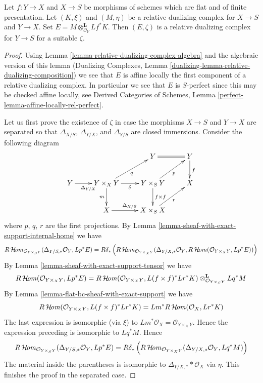 \begin{lemma}
\label{lemma-relative-dualizing-composition}
Let $f : Y \to X$ and $X \to S$ be morphisms of schemes
which are flat and of finite presentation.
Let $(K, \xi)$ and $(M, \eta)$
be a relative dualizing complex for $X \to S$ and $Y \to X$.
Set $E = M \otimes_{\mathcal{O}_Y}^\mathbf{L} Lf^*K$.
Then $(E, \zeta)$ is a relative dualizing complex for $Y \to S$ for
a suitable $\zeta$.
\end{lemma}

\begin{proof}
Using Lemma \ref{lemma-relative-dualizing-complex-algebra}
and the algebraic version of this lemma (Dualizing Complexes, Lemma
\ref{dualizing-lemma-relative-dualizing-composition})
we see that $E$
is affine locally the first component of a relative dualizing complex.
In particular we see that $E$
is $S$-perfect since this may be checked affine locally, see
Derived Categories of Schemes, Lemma
\ref{perfect-lemma-affine-locally-rel-perfect}.

\medskip\noindent
Let us first prove the existence of $\zeta$ in case the
morphisms $X \to S$ and $Y \to X$ are separated so that
$\Delta_{X/S}$, $\Delta_{Y/X}$, and $\Delta_{Y/S}$
are closed immersions. Consider the following diagram
$$
\xymatrix{
& & Y \ar@{=}[r] & Y \ar[d]^f \\
Y \ar[r]_{\Delta_{Y/X}} &
Y \times_X Y \ar[d]_m \ar[r]_\delta \ar[ru]_q &
Y \times_S Y \ar[d]^{f \times f} \ar[ru]_p & X\\
& X \ar[r]^{\Delta_{X/S}} & X \times_S X \ar[ru]_r
}
$$
where $p$, $q$, $r$ are the first projections.
By Lemma \ref{lemma-sheaf-with-exact-support-internal-home}
we have
$$
R\mathop{\mathcal{H}\!\mathit{om}}\nolimits_{\mathcal{O}_{Y \times_S Y}}(
\Delta_{Y/S, *}\mathcal{O}_Y, Lp^*E) =
R\delta_*\left(R\mathop{\mathcal{H}\!\mathit{om}}\nolimits_{\mathcal{O}_{Y \times_X Y}}(
\Delta_{Y/X, *}\mathcal{O}_Y,
R\mathop{\mathcal{H}\!\mathit{om}}\nolimits(\mathcal{O}_{Y \times_X Y}, Lp^*E))\right)
$$
By Lemma \ref{lemma-sheaf-with-exact-support-tensor} we have
$$
R\mathop{\mathcal{H}\!\mathit{om}}\nolimits(\mathcal{O}_{Y \times_X Y}, Lp^*E) =
R\mathop{\mathcal{H}\!\mathit{om}}\nolimits(\mathcal{O}_{Y \times_X Y}, L(f \times f)^*Lr^*K)
\otimes_{\mathcal{O}_{Y \times_S Y}}^\mathbf{L} Lq^*M
$$
By Lemma \ref{lemma-flat-bc-sheaf-with-exact-support} we have
$$
R\mathop{\mathcal{H}\!\mathit{om}}\nolimits(\mathcal{O}_{Y \times_X Y}, L(f \times f)^*Lr^*K) =
Lm^*R\mathop{\mathcal{H}\!\mathit{om}}\nolimits(\mathcal{O}_X, Lr^*K)
$$
The last expression is isomorphic (via $\xi$) to
$Lm^*\mathcal{O}_X = \mathcal{O}_{Y \times_X Y}$.
Hence the expression preceding is isomorphic to
$Lq^*M$. Hence
$$
R\mathop{\mathcal{H}\!\mathit{om}}\nolimits_{\mathcal{O}_{Y \times_S Y}}(
\Delta_{Y/S, *}\mathcal{O}_Y, Lp^*E) =
R\delta_*\left(R\mathop{\mathcal{H}\!\mathit{om}}\nolimits_{\mathcal{O}_{Y \times_X Y}}(
\Delta_{Y/X, *}\mathcal{O}_Y, Lq^*M)\right)
$$
The material inside the parentheses is isomorphic to
$\Delta_{Y/X, *}*\mathcal{O}_X$ via $\eta$.
This finishes the proof in the separated case.


\end{proof}
